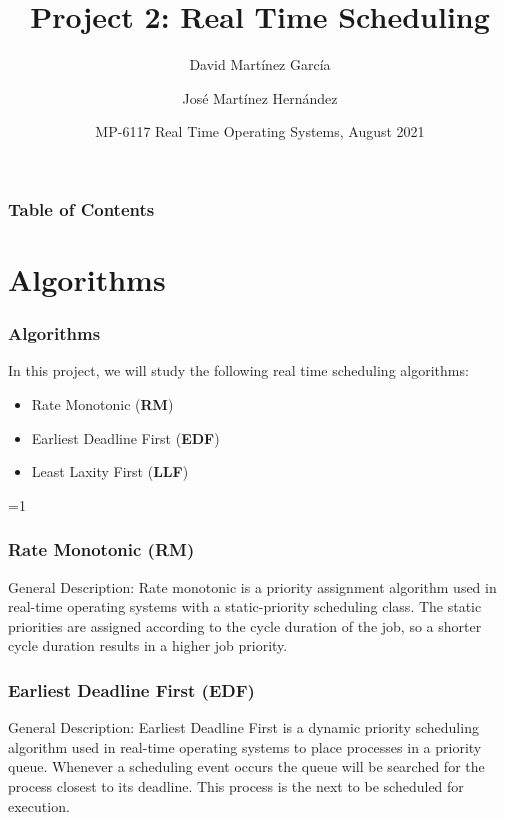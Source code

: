 \documentclass{beamer}
\title[Real Time Scheduling] %
{Project 2: Real Time Scheduling}
\author[ David Martínez, José Martínez] %
{David Martínez García\inst{1} \and José Martínez Hernández\inst{2}}
\institute[TEC] %
{
  \inst{1}%
  \url{david.martinez@estudiantec.cr}\\
  \textsc{2007058596}
  \and
  \inst{2}%
  \url{jpmh.1309@estudiantec.cr} \\
  \textsc{2020426476}
}
\date[August 2021] %
{MP-6117 Real Time Operating Systems, August 2021}
\begin{document}
\setcounter{rm}{1}
    
\frame{\titlepage}


\begin{frame}
\frametitle{Table of Contents}
\tableofcontents
\end{frame}


\section{Algorithms}

\begin{frame}
\frametitle{Algorithms}
In this project, we will study the following real time scheduling algorithms:

\begin{itemize}
    \item Rate Monotonic (\textbf{RM})
    \item Earliest Deadline First (\textbf{EDF})
    \item Least Laxity First (\textbf{LLF})
\end{itemize}
\end{frame}


\ifnum \value{rm}=1 {
\begin{frame}
\frametitle{Rate Monotonic (\textbf{RM})}

\begin{alertblock}{General Description:}
Rate monotonic is a priority assignment algorithm used in real-time operating systems with a static-priority scheduling class. The static priorities are assigned according to the cycle duration of the job, so a shorter cycle duration results in a higher job priority.
\end{alertblock}

\end{frame}
}

\begin{frame}
\frametitle{Earliest Deadline First (\textbf{EDF})}

\begin{alertblock}{General Description:}
Earliest Deadline First is a dynamic priority scheduling algorithm used in real-time operating systems to place processes in a priority queue. Whenever a scheduling event occurs the queue will be searched for the process closest to its deadline. This process is the next to be scheduled for execution.
\end{alertblock}

\end{frame}
\end{document}
